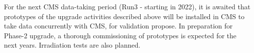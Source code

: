 
For the next CMS data-taking period (Run3 - starting in 2022), it is awaited that prototypes of the upgrade activities described above will be installed in CMS to take data concurrently with CMS, for validation propose. In preparation for Phase-2 upgrade, a thorough commissioning of prototypes is expected for the next years. Irradiation tests are also planned.